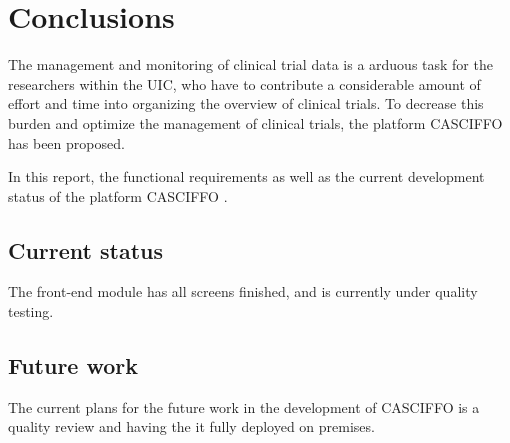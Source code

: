 \chapter{Conclusions}\label{ch:conclusion}
The management and monitoring of clinical trial data is a arduous task for the researchers within the UIC, who have to contribute a considerable amount of effort and time into organizing the overview of clinical trials. To decrease this burden and optimize the management of clinical trials, the platform CASCIFFO has been proposed.

In this report, the functional requirements as well as the current development status of the platform CASCIFFO .

\section{Current status}\label{sec:current-status}

The front-end module has all screens finished, and is currently under quality testing.

\section{Future work}\label{sec:future-work}

The current plans for the future work in the development of CASCIFFO is a quality review and having the it fully deployed on premises.

